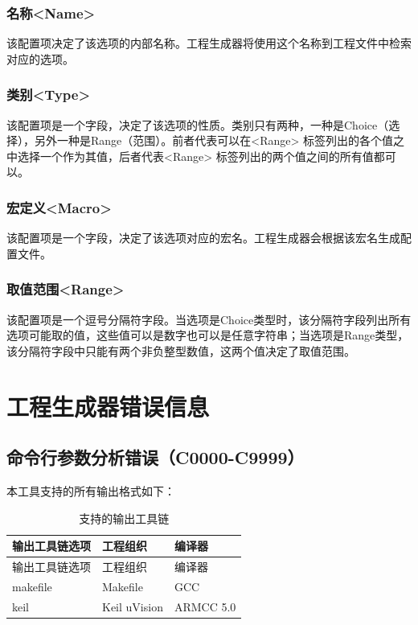 \subsubsection{名称<Name>{}}\label{subsubsec:5-5-13-1}

该配置项决定了该选项的内部名称。工程生成器将使用这个名称到工程文件中检索对应的选项。

\subsubsection{类别<Type>{}}\label{subsubsec:5-5-13-2}

该配置项是一个字段，决定了该选项的性质。类别只有两种，一种是Choice（选择），另外一种是Range（范围）。前者代表可以在<Range> 标签列出的各个值之中选择一个作为其值，后者代表<Range> 标签列出的两个值之间的所有值都可以。

\subsubsection{宏定义<Macro>{}}\label{subsubsec:5-5-13-3}

该配置项是一个字段，决定了该选项对应的宏名。工程生成器会根据该宏名生成配置文件。

\subsubsection{取值范围<Range>{}}\label{subsubsec:5-5-13-4}

该配置项是一个逗号分隔符字段。当选项是Choice类型时，该分隔符字段列出所有选项可能取的值，这些值可以是数字也可以是任意字符串；当选项是Range类型，该分隔符字段中只能有两个非负整型数值，这两个值决定了取值范围。


\section{工程生成器错误信息}\label{sec:5-6}

\subsection{命令行参数分析错误（C0000-C9999）}\label{subsec:5-6-1}

本工具支持的所有输出格式如下：

\begin{xltabular}{\textwidth}{@{}>{\hsize\raggedright\arraybackslash}X>{\hsize\raggedright\arraybackslash}X>{\hsize\raggedright\arraybackslash}X@{}}
\caption{支持的输出工具链}\label{tab:5-1}\\
\toprule
输出工具链选项 & 工程组织 & 编译器\tabularnewline
\endfirsthead
\toprule
输出工具链选项 & 工程组织 & 编译器\tabularnewline
\midrule
\endhead
\bottomrule
\endlastfoot
makefile & Makefile & GCC\tabularnewline
keil & Keil uVision & ARMCC 5.0\tabularnewline
\end{xltabular}

